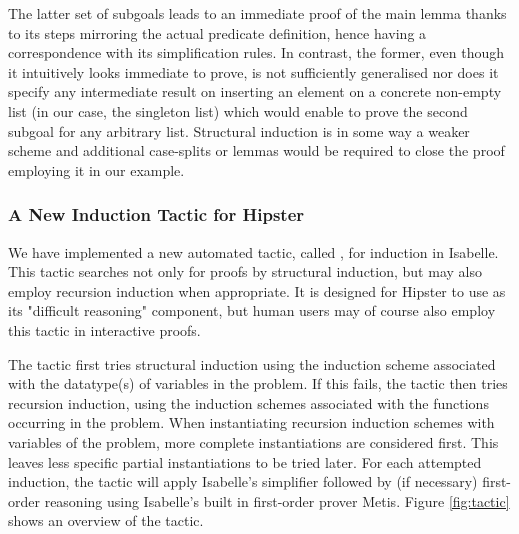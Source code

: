 \noindent The latter set of subgoals leads to an immediate proof of the main lemma thanks to its steps mirroring the actual predicate definition, hence having a correspondence with its simplification rules.
%
In contrast, the former, even though it intuitively looks immediate to prove, is not sufficiently generalised nor does it specify any intermediate result on inserting an element on a concrete non-empty list (in our case, the singleton list) which would enable to prove the second subgoal for any arbitrary list.
%
Structural induction is in some way a weaker scheme and additional case-splits or lemmas would be required to close the proof employing it in our example.


\subsubsection*{A New Induction Tactic for Hipster}


We have implemented a new automated tactic, called , for induction in Isabelle.
%
This tactic searches not only for proofs by structural induction, but may also employ recursion induction when appropriate.
%
It is designed for Hipster to use as its "difficult reasoning" component, but human users may of course also employ this tactic in interactive proofs. 

The tactic first tries structural induction using the induction scheme associated with the datatype(s) of variables in the problem.
%
If this fails, the tactic then tries recursion induction, using the induction schemes associated with the functions occurring in the problem.
%
When instantiating recursion induction schemes with variables of the problem, more complete instantiations are considered first.
%
This leaves less specific partial instantiations to be tried later.
For each attempted induction, the tactic will apply Isabelle's simplifier followed by (if necessary) first-order reasoning using Isabelle's built in first-order prover Metis.
%
Figure \ref{fig:tactic} shows an overview of the tactic.

